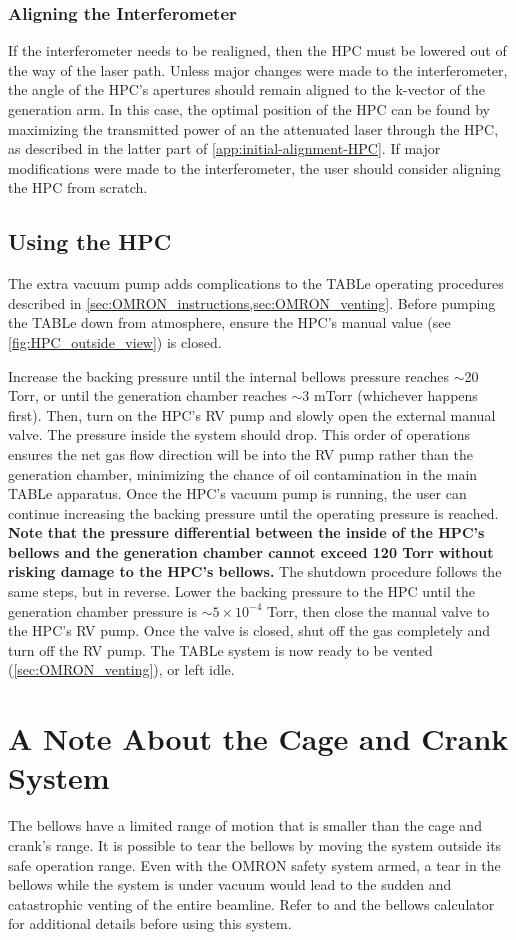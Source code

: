 \subsubsection{Aligning the Interferometer}
If the interferometer needs to be realigned, then the HPC must be lowered out of the way of the laser path. Unless major changes were made to the interferometer, the angle of the HPC's apertures should remain aligned to the k-vector of the generation arm. In this case, the optimal position of the HPC can be found by maximizing the transmitted power of an the attenuated laser through the HPC, as described in the latter part of \cref{app:initial-alignment-HPC}. If major modifications were made to the interferometer, the user should consider aligning the HPC from scratch.


\subsection{Using the HPC}

The extra vacuum pump adds complications to the TABLe operating procedures described in \cref{sec:OMRON_instructions,sec:OMRON_venting}. Before pumping the TABLe down from atmosphere, ensure the HPC's manual value (see \cref{fig:HPC_outside_view}) is closed.

Increase the backing pressure until the internal bellows pressure reaches $\sim$20 Torr, or until the generation chamber reaches $\sim$3 mTorr (whichever happens first). Then, turn on the HPC's RV pump and slowly open the external manual valve. The pressure inside the system should drop. This order of operations ensures the net gas flow direction will be into the RV pump rather than the generation chamber, minimizing the chance of oil contamination in the main TABLe apparatus. Once the HPC's vacuum pump is running, the user can continue increasing the backing pressure until the operating pressure is reached. \textbf{Note that the pressure differential between the inside of the HPC's bellows and the generation chamber cannot exceed 120 Torr without risking damage to the HPC's bellows.} The shutdown procedure follows the same steps, but in reverse. Lower the backing pressure to the HPC until the generation chamber pressure is $\sim 5 \times 10^{-4}$ Torr, then close the manual valve to the HPC's RV pump. Once the valve is closed, shut off the gas completely and turn off the RV pump. The TABLe system is now ready to be vented (\cref{sec:OMRON_venting}), or left idle.

\section{A Note About the Cage and Crank System}
\label{sec:cage_crank_app}

The bellows have a limited range of motion that is smaller than the cage and crank's range. It is possible to tear the bellows by moving the system outside its safe operation range. Even with the OMRON safety system armed, a tear in the bellows while the system is under vacuum would lead to the sudden and catastrophic venting of the entire beamline. Refer to \cite{hagemanComplexAttosecondTransient2020} and the bellows calculator for additional details before using this system.
